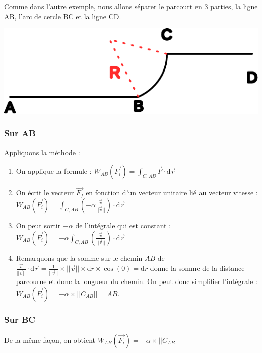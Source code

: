 \documentclass[french]{yLectureNote}
\renewcommand{\vec}{\overrightarrow}
\newcommand{\norm}[1]{||\vec{#1}||}
\newcommand{\dd}[0]{\mathrm{d}}
\begin{document}
Comme dans l'autre exemple, nous allons séparer le parcourt en 3 parties, la ligne AB, l'arc de cercle BC et la ligne CD.

\includegraphics[scale=0.6]{schema2}
\subsubsection{Sur AB}
Appliquons la méthode :
\begin{enumerate}
 \item On applique la formule : $W_{AB}(\vec{F_i}) = \int_{C,AB}\vec{F}\cdot \dd \vec{r}$
 \item On écrit le vecteur $\vec{F_f}$ en fonction d'un vecteur unitaire lié au vecteur vitesse : $W_{AB}(\vec{F_i}) = \int_{C,AB}(-\alpha \frac{\vec{v}}{\norm{v}})\cdot \dd \vec{r}$
 \item On peut sortir $-\alpha$ de l'intégrale qui est constant : $W_{AB}(\vec{F_i}) = -\alpha\int_{C,AB}( \frac{\vec{v}}{\norm{v}})\cdot \dd \vec{r}$
 \item Remarquons que la somme sur le chemin $AB$ de $\frac{\vec{v}}{\norm{v}}\cdot \dd \vec{r} = \frac{1}{\norm{v}}\times \norm{v}\times \dd r \times \cos(0) = \dd r$ donne la somme de la distance parcourue et donc la longueur du chemin. On peut donc simplifier l'intégrale : $W_{AB}(\vec{F_i}) = -\alpha\times ||C_{AB}|| = AB$.
\end{enumerate}
\subsubsection{Sur BC}
De la m\^eme façon, on obtient $W_{AB}(\vec{F_i}) = -\alpha\times ||C_{AB}||$
\end{document}
